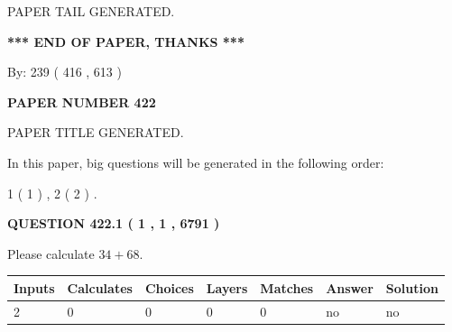 \documentclass[12pt]{article}
\begin{document}
   
   
   
   
   
 \vspace{0.2in}
 
   
   
\vspace{2.0in} PAPER TAIL GENERATED.
   
   
   
   
\vspace{1.0in} 
{\textbf{\large{ *** END OF PAPER, THANKS *** }}} 
   
   
\hspace{1.0in} By: 
 239 ( 416 ,  613 )
   
   
   
   
\newpage 
\setcounter{page}{ 
   422001 } 
   
   
   
   
 {\textbf{ \Large{ PAPER NUMBER  422  }}}
   
   
\vspace{0.2in}
   
   
   
   
   
   
   
   
 \vspace{0.2in}
 
 
 
 
   
   
 PAPER TITLE GENERATED.
   
   
   
\vspace{0.2in}
   
In this paper, big questions will be generated in the following order: 
   
   
   1 ( 1 )
 ,
   2 ( 2 )
 .
  
\vspace{0.2in}
  
{\textbf{\Large{QUESTION
422.1 
 ( 1 , 1 , 6791 )
}}}
  
  
 
Please calculate $ %
34 +  %
68 $.
 
 
   
   
   
   
\noindent\begin{tabular}{|l|l|l|l|l|l|l|}
 \hline
Inputs & Calculates & Choices & Layers & Matches & Answer & Solution \\ \hline
 2  & 
 0  & 
 0
  & 
 0  & 
 0  & 
  no & 
  no 
  \\ \hline
 \end{tabular}
   
\end{document}
